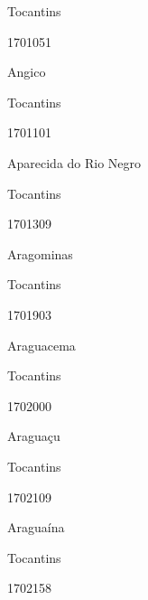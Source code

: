 \documentclass[
  letterpaper,
]{report}
\begin{document}
\n      

Tocantins

\n      

1701051

\n      

Angico

\n    

\n    

\n      

Tocantins

\n      

1701101

\n      

Aparecida do Rio Negro

\n    

\n    

\n      

Tocantins

\n      

1701309

\n      

Aragominas

\n    

\n    

\n      

Tocantins

\n      

1701903

\n      

Araguacema

\n    

\n    

\n      

Tocantins

\n      

1702000

\n      

Araguaçu

\n    

\n    

\n      

Tocantins

\n      

1702109

\n      

Araguaína

\n    

\n    

\n      

Tocantins

\n      

1702158

\n      
\end{document}
